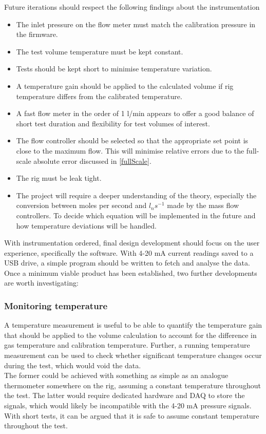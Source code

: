\documentclass{report}
\begin{document}
Future iterations should respect the following findings about the instrumentation
\begin{itemize}
	\item The inlet pressure on the flow meter must match the calibration pressure  in the firmware.
	\item The test volume temperature must be kept constant.
	\item Tests should be kept short to minimise temperature variation. 
	\item A temperature gain should be applied to the calculated volume if rig temperature differs from the calibrated temperature.
	\item A fast flow meter in the order of 1 l/min appears to offer a good balance of short test duration and flexibility for test volumes of interest.
	\item The flow controller should be selected so that the appropriate set point is close to the maximum flow. This will minimise relative errors due to the full-scale absolute error discussed in \ref{fullScale}.
	\item The rig must be leak tight.
	\item The project will require a deeper understanding of the theory, especially the conversion between moles per second and $l_ns^{-1}$ made by the mass flow controllers. To decide which equation will be implemented in the future and how temperature deviations will be handled.
\end{itemize}	
With instrumentation ordered, final design development should focus on the user experience, specifically the software. With 4-20 mA current readings saved to a USB drive, a simple program should be written to fetch and analyse the data.
Once a minimum viable product has been established, two further developments are worth investigating:
\subsubsection{Monitoring temperature} 
A temperature measurement is useful to be able to quantify the temperature gain that should be applied to the volume calculation to account for the difference in gas temperature and calibration temperature. Further, a running temperature measurement can be used to check whether significant temperature changes occur during the test, which would void the data.\\
The former could be achieved with something as simple as an analogue thermometer somewhere on the rig, assuming a constant temperature throughout the test. The latter would require dedicated hardware and DAQ to store the signals, which would likely be incompatible with the 4-20 mA pressure signals. With short tests, it can be argued that it is safe to assume constant temperature throughout the test.
\end{document}

